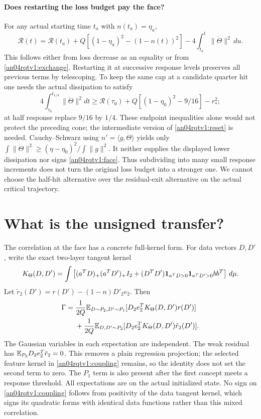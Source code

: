 \documentclass[11pt]{article}
\begin{document}
\paragraph{Does restarting the loss budget pay the face?}
For any actual starting time $t_a$ with $n(t_a)=\eta_a$,
\begin{equation}\label{an04rqtv1:reset}
 \mathcal R(t)= \mathcal R(t_a)+
 Q[(1-\eta_a)^2-(1-n(t))^2]
 -4\int_{t_a}^t\|\dot\Theta\|^2\,du .
\end{equation}
This follows either from loss decrease as an equality or from
\eqref{an04rqtv1:exchange}. Restarting it at successive response
levels preserves all previous terms by telescoping.
To keep the same cap at a candidate quarter hit one needs the
actual dissipation to satisfy
\[
 4\int_{\tau_0}^{t_{1/4}}\|\dot\Theta\|^2dt
 \ge \mathcal R(\tau_0)+Q[(1-\eta_0)^2-9/16]-r_*^2;
\]
at half response replace $9/16$ by $1/4$.
These endpoint inequalities alone would not protect the preceding
cone; the intermediate version of \eqref{an04rqtv1:reset} is needed.
Cauchy--Schwarz using $n'=\langle g,\dot\Theta\rangle$ yields only
$\int\|\dot\Theta\|^2\ge(\eta-\eta_0)^2/\int\|g\|^2$.
It neither supplies the displayed lower dissipation nor signs
\eqref{an04rqtv1:face}. Thus subdividing into many small response
increments does not turn the original loss budget into a stronger
one. We cannot choose the half-hit alternative over the
residual-exit alternative on the actual critical trajectory.

\section{What is the unsigned transfer?}
The correlation at the face has a concrete full-kernel form.
For data vectors $D,D'$, write the exact two-layer tangent kernel
\[
 K_\Theta(D,D')=\int\left[
 (a^TD)_+(a^TD')_+ I_2+
 (D^TD'){\bf1}_{a^TD>0}{\bf1}_{a^TD'>0}bb^T\right]\,d\mu .
\]
Let $\tilde r_2(D')=r(D')-(1-n)D'_2 e_2$. Then
\begin{align}
 \Gamma={}&\frac1{2Q}\mathbb E_{D\sim P_2,D'\sim P_1}
       [D_2 e_2^TK_\Theta(D,D')r(D')]\nonumber\\
 &+\frac1{2Q}\mathbb E_{D,D'\sim P_2}
       [D_2 e_2^TK_\Theta(D,D')\tilde r_2(D')] .
 \label{an04rqtv1:coupling}
\end{align}
The Gaussian variables in each expectation are independent.
The weak residual has $\mathbb E_{P_2}D_2 e_2^T\tilde r_2=0$.
This removes a plain regression projection; the selected feature
kernel in \eqref{an04rqtv1:coupling} remains, so the identity
does not set the second term to zero. The $P_1$ term is also
present after the first concept meets a response threshold.
All expectations are on the actual initialized state. No sign
on \eqref{an04rqtv1:coupling} follows from positivity of the
data tangent kernel, which signs its quadratic forms with identical
data functions rather than this mixed correlation.
\end{document}
